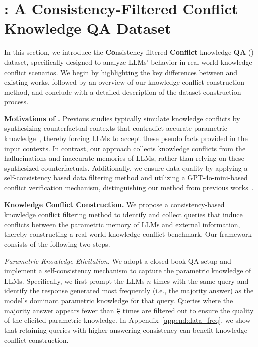 

\section{\dataset{}: A Consistency-Filtered Conflict Knowledge QA Dataset} \label{sec:benchmark}



In this section, we introduce the \textbf{Co}nsistency-filtered \textbf{Conflict} knowledge \textbf{QA} (\dataset{}) dataset, specifically designed to analyze LLMs' behavior in real-world knowledge conflict scenarios. We begin by highlighting the key differences between \dataset{} and existing works, followed by an overview of our knowledge conflict construction method, and conclude with a detailed description of the dataset construction process.


\textbf{Motivations of \dataset{}.}
Previous studies typically simulate knowledge conflicts by synthesizing counterfactual contexts that contradict accurate parametric knowledge~\cite{longpre2021entity,si2022prompting,xie2023adaptive}, thereby forcing LLMs to accept these pseudo facts provided in the input contexts. In contrast, our approach collects knowledge conflicts from the hallucinations and inaccurate memories of LLMs, rather than relying on these synthesized counterfactuals. Additionally, we ensure data quality by applying a self-consistency based data filtering method and utilizing a GPT-4o-mini-based conflict verification mechanism, distinguishing our method from previous works~\cite{yuan2024discerning,kortukovstudying}.



\textbf{Knowledge Conflict Construction.}
We propose a consistency-based knowledge conflict filtering method to identify and collect queries that induce conflicts between the parametric memory of LLMs and external information, thereby constructing a real-world knowledge conflict benchmark. Our framework consists of the following two steps.

\textit{Parametric Knowledge Elicitation.} 
We adopt a closed-book QA setup and implement a self-consistency mechanism to capture the parametric knowledge of LLMs. Specifically, we first prompt the LLMs $n$ times with the same query and identify the response generated most frequently (i.e., the majority answer) as the model's dominant parametric knowledge for that query. Queries where the majority answer appears fewer than $\frac{n}{2}$ times are filtered out to ensure the quality of the elicited parametric knowledge. In Appendix~\ref{append:data_freq}, we show that retaining queries with higher answering consistency can benefit knowledge conflict construction.



